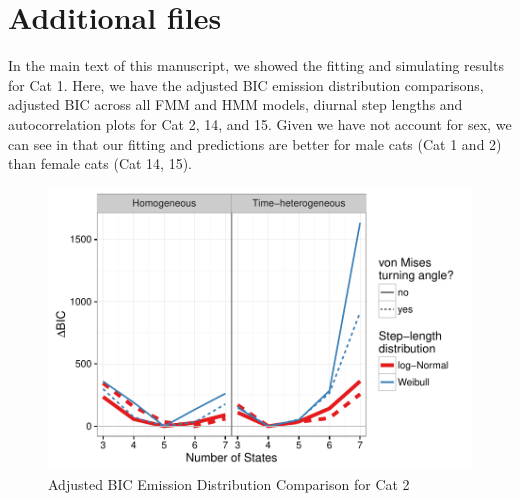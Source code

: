 \documentclass{article}\usepackage[]{graphicx}\usepackage{xcolor}
\makeatletter
\def\maxwidth{ %
  \ifdim\Gin@nat@width>\linewidth
    \linewidth
  \else
    \Gin@nat@width
  \fi
}
\newenvironment{knitrout}{}{} %
\makeatother
\begin{document}
\section*{Additional files}

  In the main text of this manuscript, we showed the fitting and simulating results for Cat 1. Here, we have the adjusted BIC emission distribution comparisons, adjusted BIC across all FMM and HMM models, diurnal step lengths and autocorrelation plots for Cat 2, 14, and 15. Given we have not account for sex, we can see in that our fitting and predictions are better for male cats (Cat 1 and 2) than female cats (Cat 14, 15). 
  
\newpage


















\begin{knitrout}
\color{fgcolor}\begin{figure}
\includegraphics[width=\maxwidth]{figure/BICred_plot2-1} \caption[Adjusted BIC Emission Distribution Comparison for Cat 2]{Adjusted BIC Emission Distribution Comparison for Cat 2}\label{fig:BICred_plot2}
\end{figure}


\end{knitrout}
\end{document}
